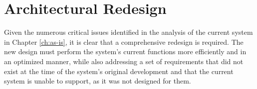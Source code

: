 \chapter{Architectural Redesign}\label{ch:architectural-redesign}

Given the numerous critical issues identified in the analysis of the current system in Chapter \ref{ch:as-is}, it is clear that a comprehensive redesign is required. The new design must perform the system's current functions more efficiently and in an optimized manner, while also addressing a set of requirements that did not exist at the time of the system's original development and that the current system is unable to support, as it was not designed for them.






